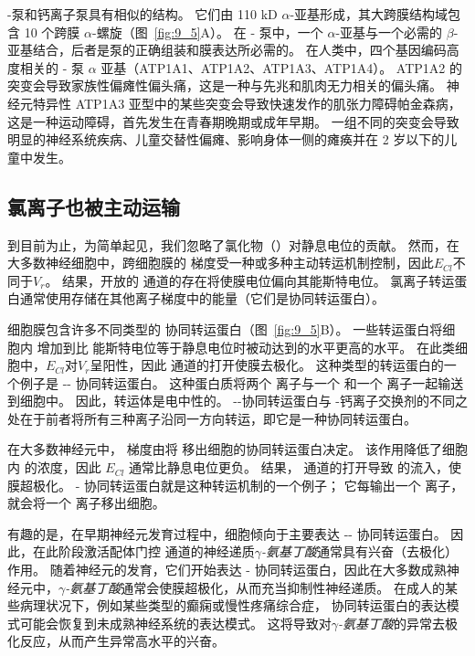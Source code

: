 -泵和钙离子泵具有相似的结构。
它们由 110 kD $\alpha$-亚基形成，其大跨膜结构域包含 10 个跨膜 $\alpha$-螺旋（图~\ref{fig:9_5}A）。
在 - 泵中，一个 $\alpha$-亚基与一个必需的 $\beta$-亚基结合，后者是泵的正确组装和膜表达所必需的。
在人类中，四个基因编码高度相关的 - 泵 $\alpha$ 亚基（ATP1A1、ATP1A2、ATP1A3、ATP1A4）。
ATP1A2 的突变会导致家族性偏瘫性偏头痛，这是一种与先兆和肌肉无力相关的偏头痛。
神经元特异性 ATP1A3 亚型中的某些突变会导致快速发作的肌张力障碍帕金森病，这是一种运动障碍，首先发生在青春期晚期或成年早期。
一组不同的突变会导致明显的神经系统疾病、儿童交替性偏瘫、影响身体一侧的瘫痪并在 2 岁以下的儿童中发生。



\subsection{氯离子也被主动运输}
到目前为止，为简单起见，我们忽略了氯化物（）对静息电位的贡献。 
然而，在大多数神经细胞中，跨细胞膜的  梯度受一种或多种主动转运机制控制，因此$E_{Cl}$不同于$V_r$。 
结果，开放的  通道的存在将使膜电位偏向其能斯特电位。
氯离子转运蛋白通常使用存储在其他离子梯度中的能量（它们是协同转运蛋白）。


细胞膜包含许多不同类型的  协同转运蛋白（图~\ref{fig:9_5}B）。
一些转运蛋白将细胞内  增加到比  能斯特电位等于静息电位时被动达到的水平更高的水平。
在此类细胞中，$E_{Cl}$对$V_r$呈阳性，因此  通道的打开使膜去极化。
这种类型的转运蛋白的一个例子是 -- 协同转运蛋白。
这种蛋白质将两个  离子与一个  和一个  离子一起输送到细胞中。
因此，转运体是电中性的。
--协同转运蛋白与 -钙离子交换剂的不同之处在于前者将所有三种离子沿同一方向转运，即它是一种协同转运蛋白。


在大多数神经元中， 梯度由将  移出细胞的协同转运蛋白决定。
该作用降低了细胞内  的浓度，因此 $E_{Cl}$ 通常比静息电位更负。
结果， 通道的打开导致  的流入，使膜超极化。
- 协同转运蛋白就是这种转运机制的一个例子； 它每输出一个  离子，就会将一个  离子移出细胞。


有趣的是，在早期神经元发育过程中，细胞倾向于主要表达 -- 协同转运蛋白。 
因此，在此阶段激活配体门控  通道的神经递质\textit{$\gamma$-氨基丁酸}通常具有兴奋（去极化）作用。 
随着神经元的发育，它们开始表达 - 协同转运蛋白，因此在大多数成熟神经元中，\textit{$\gamma$-氨基丁酸}通常会使膜超极化，从而充当抑制性神经递质。 
在成人的某些病理状况下，例如某些类型的癫痫或慢性疼痛综合症， 协同转运蛋白的表达模式可能会恢复到未成熟神经系统的表达模式。
这将导致对\textit{$\gamma$-氨基丁酸}的异常去极化反应，从而产生异常高水平的兴奋。



